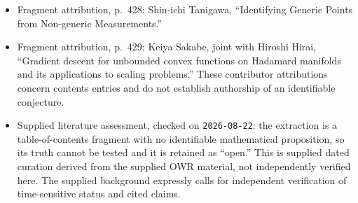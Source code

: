 \documentclass[11pt]{article}
\begin{document}
\begin{itemize}
\item Fragment attribution, p.\ 428: Shin-ichi Tanigawa, ``Identifying Generic Points from Non-generic Measurements.''
\item Fragment attribution, p.\ 429: Keiya Sakabe, joint with Hiroshi Hirai, ``Gradient descent for unbounded convex functions on Hadamard manifolds and its applications to scaling problems.'' These contributor attributions concern contents entries and do not establish authorship of an identifiable conjecture.
\item Supplied literature assessment, checked on \texttt{2026-08-22}: the extraction is a table-of-contents fragment with no identifiable mathematical proposition, so its truth cannot be tested and it is retained as ``open.'' This is supplied dated curation derived from the supplied OWR material, not independently verified here. The supplied background expressly calls for independent verification of time-sensitive status and cited claims.
\end{itemize}
\end{document}
